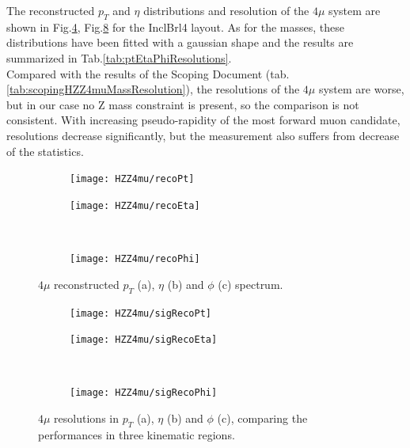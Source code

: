 \documentclass[a4paper,twoside,12pt]{article}
\begin{document}
The reconstructed $p_T$ and $\eta$ distributions and resolution of the $4\mu$ system 
are shown in Fig.\ref{fig:HZZ4mu:recoPtEtaPhi}, Fig.\ref{fig:HZZ4mu:sigRecoPtEtaPhi} for the
InclBrl4 layout. As for the masses, these distributions have been fitted with a gaussian shape
and the results are summarized in Tab.\ref{tab:ptEtaPhiResolutions}. \\

Compared with the results of the Scoping Document (tab.\ref{tab:scopingHZZ4muMassResolution}), the resolutions
of the $4\mu$ system are worse, but in our case no Z mass constraint is present, so the comparison
is not consistent. With increasing pseudo-rapidity of the most forward muon candidate,
resolutions decrease significantly, but the measurement also suffers from 
decrease of the statistics.

\begin{figure}
\begin{subfigure}{.5\linewidth}
\texttt{[image: HZZ4mu/recoPt]}
\caption{}
\label{fig:HZZ4mu:recoPt}
\end{subfigure}
\begin{subfigure}{.5\linewidth}
\centering
\texttt{[image: HZZ4mu/recoEta]}
\caption{}
\label{fig:HZZ4mu:recoEta}
\end{subfigure}\\[1ex]
\begin{subfigure}{\linewidth}
\centering
\texttt{[image: HZZ4mu/recoPhi]}
\caption{}
\label{fig:HZZ4mu:recoPhi}
\end{subfigure}
\caption{$4\mu$ reconstructed $p_{T}$ (a), $\eta$ (b) and $\phi$ (c) spectrum.}
\label{fig:HZZ4mu:recoPtEtaPhi}
\end{figure}

\begin{figure}
\begin{subfigure}{.5\linewidth}
\texttt{[image: HZZ4mu/sigRecoPt]}
\caption{}
\label{fig:HZZ4mu:sigRecoPt}
\end{subfigure}
\begin{subfigure}{.5\linewidth}
\centering
\texttt{[image: HZZ4mu/sigRecoEta]}
\caption{}
\label{fig:HZZ4mu:sigRecoEta}
\end{subfigure}\\[1ex]
\begin{subfigure}{\linewidth}
\centering
\texttt{[image: HZZ4mu/sigRecoPhi]}
\caption{}
\label{fig:HZZ4mu:sigRecoPhi}
\end{subfigure}
\caption{$4\mu$ resolutions in $p_{T}$ (a), $\eta$ (b) and $\phi$ (c), comparing
	the performances in three kinematic regions.}
\label{fig:HZZ4mu:sigRecoPtEtaPhi}
\end{figure}
\end{document}
